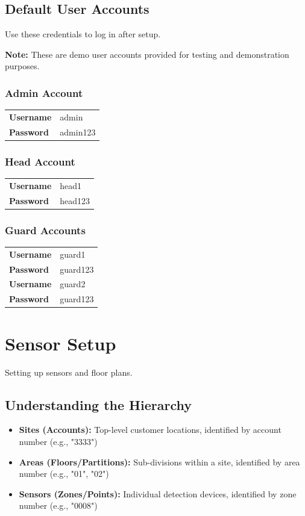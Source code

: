 \documentclass[12pt,a4paper]{article}
\begin{document}
\subsection{Default User Accounts}

Use these credentials to log in after setup.

\textbf{Note:} These are demo user accounts provided for testing and demonstration purposes.

\subsubsection{Admin Account}
\begin{tabular}{|l|l|}
\hline
\textbf{Username} & admin \\
\textbf{Password} & admin123 \\
\hline
\end{tabular}

\subsubsection{Head Account}
\begin{tabular}{|l|l|}
\hline
\textbf{Username} & head1 \\
\textbf{Password} & head123 \\
\hline
\end{tabular}

\subsubsection{Guard Accounts}
\begin{tabular}{|l|l|}
\hline
\textbf{Username} & guard1 \\
\textbf{Password} & guard123 \\
\hline
\textbf{Username} & guard2 \\
\textbf{Password} & guard123 \\
\hline
\end{tabular}

\section{Sensor Setup}

Setting up sensors and floor plans.

\subsection{Understanding the Hierarchy}
\begin{itemize}
\item \textbf{Sites (Accounts):} Top-level customer locations, identified by account number (e.g., "3333")
\item \textbf{Areas (Floors/Partitions):} Sub-divisions within a site, identified by area number (e.g., "01", "02")
\item \textbf{Sensors (Zones/Points):} Individual detection devices, identified by zone number (e.g., "0008")
\end{itemize}
\end{document}

